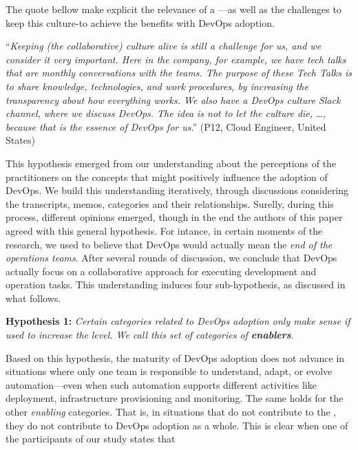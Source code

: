 The quote bellow make explicit the relevance of a \cc
---as well as the challenges to keep this culture-to
achieve the benefits with DevOps adoption.

\begin{mq}
  ``\emph{Keeping (the collaborative) culture alive is still a challenge for us,
  and we consider it very important. Here in the company, for example, we have
  tech talks that are monthly conversations with the teams. The
  purpose of these Tech Talks is to share knowledge, technologies, and work
  procedures, by increasing the transparency about how everything works. We also
  have a DevOps culture Slack channel, where we discuss DevOps. The idea
  is not to let the culture die, \ldots, because that is the essence of
  DevOps for us}.'' (P12, Cloud Engineer, United States)
\end{mq}


{\color{blue}This hypothesis emerged from our understanding about the
perceptions of the practitioners on the concepts that might
positively influence the adoption of DevOps. We build
this understanding iteratively, through discussions
considering the transcripts, memos, categories and their relationships. Surelly, during this
process, different opinions emerged, though in the end
the authors of this paper agreed with this general hypothesis.
For intance, in certain moments of the research, we used to believe that DevOps would
actually mean the \emph{end of the operations teams}. After
several rounds of discussion, we conclude that DevOps actually
focus on a collaborative approach for executing development and
operation tasks. This understanding induces four sub-hypothesis, as discussed in what
follows.}

\begin{mh}
\textbf{Hypothesis 1:} \textit{Certain categories related to DevOps adoption
only make sense if used to increase the} \cc \emph{level. We
call this set of categories of \textbf{enablers}}.
\end{mh}

Based on this hypothesis, the maturity of DevOps adoption does not
advance in situations where only one team is responsible to understand, adapt, or
evolve automation---even when such automation supports different activities like
deployment, infrastructure provisioning and monitoring. The same holds for the
other \emph{enabling} categories. That is, in situations that
 do not contribute to
the \cc, they do not contribute to DevOps adoption as a whole. This is
clear when one of the participants of our study states that

